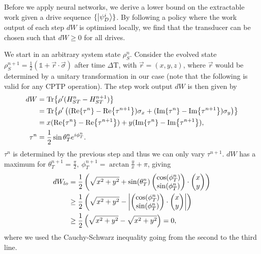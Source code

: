 Before we apply neural networks, we derive a lower bound on the extractable work given a drive sequence $\{\ket{\psi_D^i}\}$.
By following a policy where the work output of each step $dW$ is optimised locally, we find that the transducer can be chosen such that $dW \geq 0$ for all drives.

We start in an arbitrary system state $\rho_S^n$.
Consider the evolved state $\rho_S^{n+1} =\frac{1}{2} (\mathds{1} + \vec{r} \cdot \vec{\sigma})$ after time $\Delta \mathrm{T}$, with $\vec{r} = ( x, y, z )$, where $\vec{r}$ would be determined by a unitary transformation in our case (note that the following is valid for any CPTP operation). The step work output $dW$ is then given by
\begin{align*}
dW &= \Tr{\rho' (H_{ST}^{n} - H_{ST}^{n+1})} \\
&= \Tr{\rho' \left((\Re{\tau^n} - \Re{\tau^{n+1}}) \sigma_x + (\Im{\tau^n} - \Im{\tau^{n+1}} ) \sigma_y \right)} \\
&= x (\Re{\tau^n} - \Re{\tau^{n+1}}) + y (\Im{\tau^n} - \Im{\tau^{n+1}}), \\
\tau^n &= \frac{1}{2} \sin{\theta_T^n} e^{i\phi_T^n}. 
\end{align*}
$\tau^n$ is determined by the previous step and thus we can only vary $\tau^{n+1}$.
$dW$ has a maximum for $\theta_T^{n+1} = \frac{\pi}{2}, \ \phi_T^{n+1} = \arctan{\frac{y}{x}} + \pi$, giving
\begin{align*}
dW_{lo} &= \frac{1}{2}\left(\sqrt{x^2 + y^2} + \sin(\theta^n_T) \begin{pmatrix} \cos(\phi^n_T) \\ \sin(\phi^n_T) \end{pmatrix} \cdot \begin{pmatrix} x \\ y \end{pmatrix} \right) \\
 &\geq \frac{1}{2}\left(\sqrt{x^2 + y^2} - \abs{ \begin{pmatrix} \cos(\phi^n_T) \\ \sin(\phi^n_T) \end{pmatrix} \cdot \begin{pmatrix} x \\ y \end{pmatrix}} \right) \\
 &\geq \frac{1}{2}\left(\sqrt{x^2 + y^2} - \sqrt{x^2 + y^2} \right) = 0,
\end{align*}
where we used the Cauchy-Schwarz inequality going from the second to the third line.

